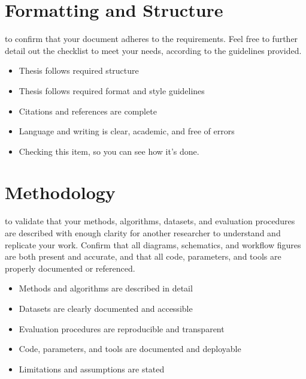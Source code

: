 


\bigskip
\section{Formatting and Structure}
 to confirm that your document adheres to the requirements. Feel free to further detail out the checklist to
meet your needs, according to the guidelines provided.

\begin{itemize}[label={}]
	\item [$\Box$]Thesis follows required structure
	\item [$\Box$]Thesis follows required format and style guidelines
	\item [$\Box$]Citations and references are complete
	\item [$\Box$]Language and writing is clear, academic, and free of errors
	\item [$\CheckedBox$] Checking this item, so you can see how it's done.
\end{itemize}


\vfill
\section{Methodology}
 to validate that your methods, algorithms, datasets, and evaluation procedures are described with enough clarity for another researcher to understand and replicate your work. Confirm that all diagrams, schematics, and workflow figures are both present and accurate, and that all code, parameters, and tools are properly documented or referenced.

\begin{itemize}[label={}]
	\item [$\Box$] Methods and algorithms are described in detail
	\item [$\Box$]Datasets are clearly documented and accessible
	\item [$\Box$]Evaluation procedures are reproducible and transparent
	\item [$\Box$]Code, parameters, and tools are documented and deployable
	\item [$\Box$]Limitations and assumptions are stated
\end{itemize}








